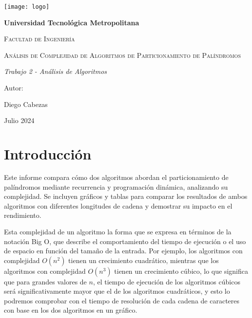 \documentclass{report}
\begin{document}
\begin{titlepage}
\centering
{\texttt{[image: logo]}\par}
\vspace{1cm}
{\bfseries\LARGE Universidad Tecnológica Metropolitana \par}
\vspace{1cm}
{\scshape\Large Facultad de Ingenier\'ia \par}
\vspace{3cm}
{\scshape\Huge Análisis de Complejidad de Algoritmos de Particionamiento de Palíndromos \par}
\vspace{3cm}
{\itshape\Large Trabajo 2 - Análisis de Algoritmos \par}
\vfill
{\Large Autor: \par}
{\Large Diego Cabezas \par}
\vfill
{\Large Julio 2024 \par}
\end{titlepage}

\begin{abstract}
Este informe presenta un análisis detallado de dos algoritmos para el particionamiento de palíndromos, evaluando su complejidad utilizando recurrencias y otros métodos. Se incluyen resultados visuales y una conclusión basada en el análisis teórico y empírico.
\end{abstract}

\section{Introducción}
Este informe compara cómo dos algoritmos abordan el particionamiento de palíndromos mediante recurrencia y programación dinámica, analizando su complejidad. Se incluyen gráficos y tablas para comparar los resultados de ambos algoritmos con diferentes longitudes de cadena y demostrar su impacto en el rendimiento.

Esta complejidad de un algoritmo la forma que se expresa en términos de la notación Big O, que describe el comportamiento del tiempo de ejecución o el uso de espacio en función del tamaño de la entrada. Por ejemplo, los algoritmos con complejidad $O(n^2)$ tienen un crecimiento cuadrático, mientras que los algoritmos con complejidad $O(n^3)$ tienen un crecimiento cúbico, lo que significa que para grandes valores de $n$, el tiempo de ejecución de los algoritmos cúbicos será significativamente mayor que el de los algoritmos cuadráticos, y esto lo podremos comprobar con el tiempo de resolución de cada cadena de caracteres con base en los dos algoritmos en un gráfico.
\end{document}
